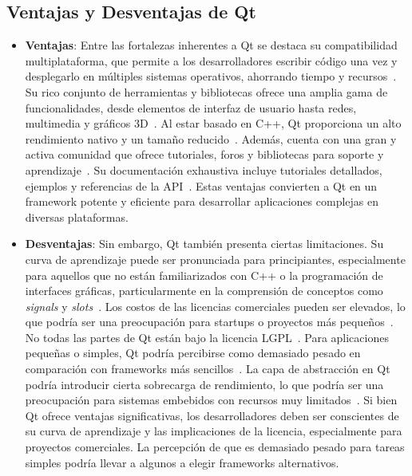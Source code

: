 \subsection{Ventajas y Desventajas de Qt}
\begin{itemize}
    \item \textbf{Ventajas}: Entre las fortalezas inherentes a Qt se destaca su compatibilidad multiplataforma, que permite a los desarrolladores escribir código una vez y desplegarlo en múltiples sistemas operativos, ahorrando tiempo y recursos~\cite{qt_wiki}. Su rico conjunto de herramientas y bibliotecas ofrece una amplia gama de funcionalidades, desde elementos de interfaz de usuario hasta redes, multimedia y gráficos 3D~\cite{qt_framework}. Al estar basado en C++, Qt proporciona un alto rendimiento nativo y un tamaño reducido~\cite{qt_framework}. Además, cuenta con una gran y activa comunidad que ofrece tutoriales, foros y bibliotecas para soporte y aprendizaje~\cite{businesscloud}. Su documentación exhaustiva incluye tutoriales detallados, ejemplos y referencias de la API~\cite{lemberg}. Estas ventajas convierten a Qt en un framework potente y eficiente para desarrollar aplicaciones complejas en diversas plataformas.
    \item \textbf{Desventajas}: Sin embargo, Qt también presenta ciertas limitaciones. Su curva de aprendizaje puede ser pronunciada para principiantes, especialmente para aquellos que no están familiarizados con C++ o la programación de interfaces gráficas, particularmente en la comprensión de conceptos como \textit{signals} y \textit{slots}~\cite{itsupplychain}. Los costos de las licencias comerciales pueden ser elevados, lo que podría ser una preocupación para startups o proyectos más pequeños~\cite{qt_wiki}. No todas las partes de Qt están bajo la licencia LGPL~\cite{lemberg}. Para aplicaciones pequeñas o simples, Qt podría percibirse como demasiado pesado en comparación con frameworks más sencillos~\cite{itsupplychain}. La capa de abstracción en Qt podría introducir cierta sobrecarga de rendimiento, lo que podría ser una preocupación para sistemas embebidos con recursos muy limitados~\cite{lemberg}. Si bien Qt ofrece ventajas significativas, los desarrolladores deben ser conscientes de su curva de aprendizaje y las implicaciones de la licencia, especialmente para proyectos comerciales. La percepción de que es demasiado pesado para tareas simples podría llevar a algunos a elegir frameworks alternativos.
\end{itemize}

